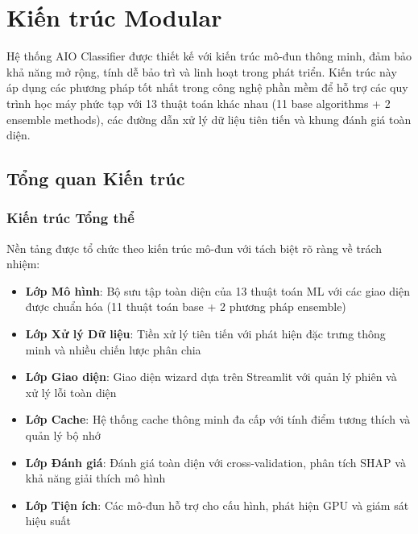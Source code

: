 \section{Kiến trúc Modular}\label{sec:modular-architecture}

\noindent
Hệ thống AIO Classifier được thiết kế với kiến trúc mô-đun thông minh, đảm bảo khả năng mở rộng, tính dễ bảo trì và linh hoạt trong phát triển. Kiến trúc này áp dụng các phương pháp tốt nhất trong công nghệ phần mềm để hỗ trợ các quy trình học máy phức tạp với 13 thuật toán khác nhau (11 base algorithms + 2 ensemble methods), các đường dẫn xử lý dữ liệu tiên tiến và khung đánh giá toàn diện.

\subsection{Tổng quan Kiến trúc}\label{subsec:architecture-overview}

\subsubsection{Kiến trúc Tổng thể}\label{subsec:overall-architecture}

Nền tảng được tổ chức theo kiến trúc mô-đun với tách biệt rõ ràng về trách nhiệm:

\begin{itemize}
    \item \textbf{Lớp Mô hình}: Bộ sưu tập toàn diện của 13 thuật toán ML với các giao diện được chuẩn hóa (11 thuật toán base + 2 phương pháp ensemble)
    \item \textbf{Lớp Xử lý Dữ liệu}: Tiền xử lý tiên tiến với phát hiện đặc trưng thông minh và nhiều chiến lược phân chia  
    \item \textbf{Lớp Giao diện}: Giao diện wizard dựa trên Streamlit với quản lý phiên và xử lý lỗi toàn diện
    \item \textbf{Lớp Cache}: Hệ thống cache thông minh đa cấp với tính điểm tương thích và quản lý bộ nhớ
    \item \textbf{Lớp Đánh giá}: Đánh giá toàn diện với cross-validation, phân tích SHAP và khả năng giải thích mô hình
    \item \textbf{Lớp Tiện ích}: Các mô-đun hỗ trợ cho cấu hình, phát hiện GPU và giám sát hiệu suất
\end{itemize}

